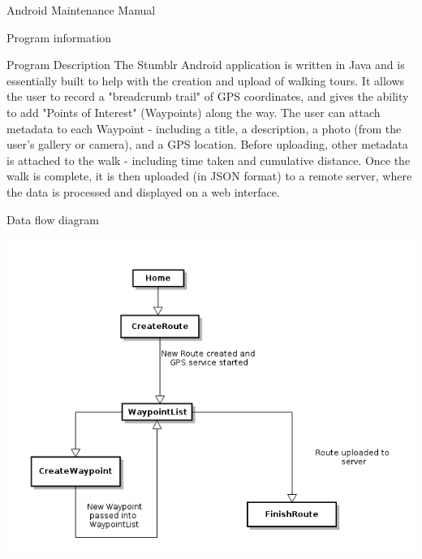 \documentclass{article}
\begin{document}
	\newpage
	\begin{section}{Android Maintenance Manual}
	\begin{subsection}{Program information}
		\begin{subsubsection}{Program Description}
			The Stumblr Android application is written in Java and is essentially built to help with the creation and upload of walking tours. It allows the user to record a "breadcrumb trail" of GPS coordinates, and gives the ability to add "Points of Interest" (Waypoints) along the way. The user can attach metadata to each Waypoint - including a title, a description, a photo (from the user's gallery or camera), and a GPS location.  Before uploading, other metadata is attached to the walk - including time taken and cumulative distance. Once the walk is complete, it is then uploaded (in JSON format) to a remote server, where the data is processed and displayed on a web interface.
		\end{subsubsection}
		
		\vspace{0.5in}
		\begin{subsubsection}{Data flow diagram}
			\begin{center}
				\includegraphics[width=\columnwidth]{img/data_flow}
			\end{center}
		\end{subsubsection}
	\end{subsection}
	

\end{section}
\end{document}
